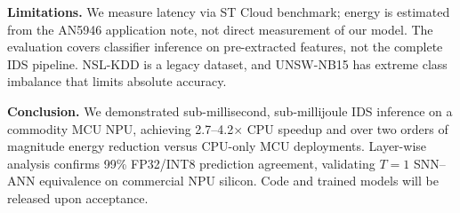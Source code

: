 \documentclass[conference]{IEEEtran}
\begin{document}
\textbf{Limitations.}
We measure latency via ST Cloud benchmark; energy is estimated from
the AN5946 application note, not direct measurement of our model.
The evaluation covers classifier inference on pre-extracted features,
not the complete IDS pipeline.
NSL-KDD is a legacy dataset, and UNSW-NB15 has extreme class
imbalance that limits absolute accuracy.

\textbf{Conclusion.}
We demonstrated sub-millisecond, sub-millijoule IDS inference on a
commodity MCU NPU, achieving 2.7--4.2$\times$ CPU speedup and over two orders of
magnitude energy reduction versus CPU-only MCU deployments.
Layer-wise analysis confirms 99\% FP32/INT8 prediction agreement,
validating $T{=}1$ SNN--ANN equivalence on commercial NPU silicon.
Code and trained models will be released upon acceptance.

\balance
{\small


}
\end{document}
